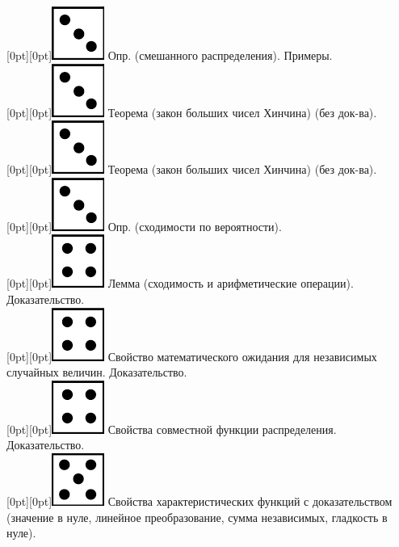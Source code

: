 \documentclass[10pt]{article}
\begin{document}
\raisebox{-1pt}[0pt][0pt]{\includegraphics[width=0.02\linewidth]{3.png}} Опр. (смешанного распределения). Примеры. \\

\raisebox{-1pt}[0pt][0pt]{\includegraphics[width=0.02\linewidth]{3.png}} Теорема (закон больших чисел Хинчина) (без док-ва). \\

\raisebox{-1pt}[0pt][0pt]{\includegraphics[width=0.02\linewidth]{3.png}} Теорема (закон больших чисел Хинчина) (без док-ва). \\

\raisebox{-1pt}[0pt][0pt]{\includegraphics[width=0.02\linewidth]{3.png}} Опр. (сходимости по вероятности). \\

\raisebox{-1pt}[0pt][0pt]{\includegraphics[width=0.02\linewidth]{4.png}} Лемма (сходимость и арифметические операции). Доказательство. \\

\raisebox{-1pt}[0pt][0pt]{\includegraphics[width=0.02\linewidth]{4.png}} Свойство  математического ожидания для независимых случайных величин. Доказательство. \\

\raisebox{-1pt}[0pt][0pt]{\includegraphics[width=0.02\linewidth]{4.png}} Свойства совместной функции распределения. Доказательство. \\

\raisebox{-1pt}[0pt][0pt]{\includegraphics[width=0.02\linewidth]{5.png}} Свойства характеристических функций с доказательством (значение в нуле, линейное преобразование, сумма независимых, гладкость в нуле). \\
\end{document}
